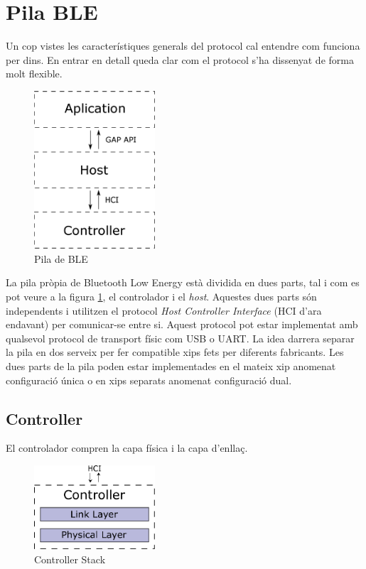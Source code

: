 \section{Pila BLE}
Un cop vistes les característiques generals del protocol cal entendre com funciona per dins.
En entrar en detall queda clar com el protocol s'ha dissenyat de forma molt flexible.

\begin{figure}[h!]
	\begin{center}
		\includegraphics[width=0.4\textwidth]{./diagrames/BLE_Stack_Simplified}
		\caption{Pila de BLE}
		\label{ble_stack}
	\end{center}
\end{figure}

La pila pròpia de Bluetooth Low Energy està dividida en dues parts, tal i com es pot veure a la figura \ref{ble_stack}, el controlador i el \textit{host}. Aquestes dues parts són independents i utilitzen el protocol \textit{Host Controller Interface} (HCI d'ara endavant) per comunicar-se entre si.
Aquest protocol pot estar implementat amb qualsevol protocol de transport físic com USB o UART.
La idea darrera separar la pila en dos serveix per fer compatible xips fets per diferents fabricants.
Les dues parts de la pila poden estar implementades en el mateix xip anomenat configuració única o en xips separats anomenat configuració dual.


\subsection{Controller}
El controlador compren la capa física i la capa d'enllaç.

\begin{figure}[h!]
	\begin{center}
		\includegraphics[width=0.4\textwidth]{./diagrames/BLE_Controller}
		\caption{Controller Stack}
	\end{center}
\end{figure}

